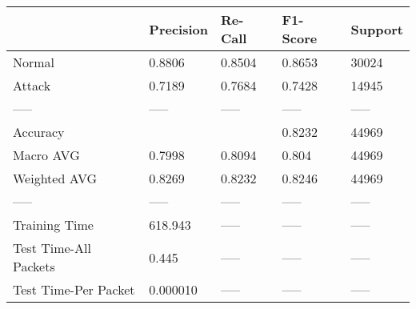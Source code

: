 \begin{tabular}{lllll}
\toprule
{} & Precision & Re-Call & F1-Score & Support \\
\midrule
Normal                &    0.8806 &  0.8504 &   0.8653 &   30024 \\
Attack                &    0.7189 &  0.7684 &   0.7428 &   14945 \\
-----                 &     ----- &   ----- &    ----- &   ----- \\
Accuracy              &           &         &   0.8232 &   44969 \\
Macro AVG             &    0.7998 &  0.8094 &    0.804 &   44969 \\
Weighted AVG          &    0.8269 &  0.8232 &   0.8246 &   44969 \\
-----                 &     ----- &   ----- &    ----- &   ----- \\
Training Time         &   618.943 &   ----- &    ----- &   ----- \\
Test Time-All Packets &     0.445 &   ----- &    ----- &   ----- \\
Test Time-Per Packet  &  0.000010 &   ----- &    ----- &   ----- \\
\bottomrule
\end{tabular}
